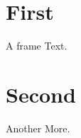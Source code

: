 \documentclass{beamer}
\begin{document}
\section{First}
\begin{frame}{A frame}
Text.
\end{frame}
\section{Second}
\begin{frame}{Another}
More.
\end{frame}
\end{document}
